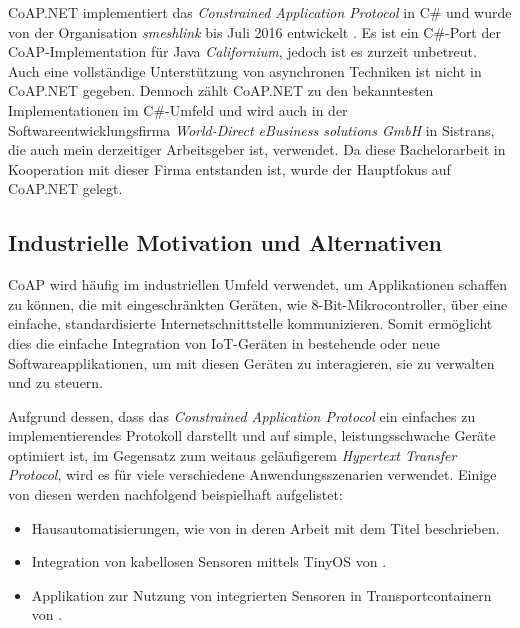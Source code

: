 CoAP.NET implementiert das \textit{Constrained Application Protocol} in C\# und wurde von der Organisation \textit{smeshlink} bis Juli 2016 entwickelt \autocite{coapnet}. Es ist ein C\#-Port der CoAP-Implementation für Java \textit{Californium}, jedoch ist es zurzeit unbetreut. Auch eine vollständige Unterstützung von asynchronen Techniken ist nicht in CoAP.NET gegeben. Dennoch zählt CoAP.NET zu den bekanntesten Implementationen im C\#-Umfeld und wird auch in der Softwareentwicklungsfirma \textit{World-Direct eBusiness solutions GmbH} in Sistrans, die auch mein derzeitiger Arbeitsgeber ist, verwendet. Da diese Bachelorarbeit in Kooperation mit dieser Firma entstanden ist, wurde der Hauptfokus auf CoAP.NET gelegt.

\subsection{Industrielle Motivation und Alternativen}
\label{subsec:industrielle-motivation-und-alternativen}

CoAP wird häufig im industriellen Umfeld verwendet, um Applikationen schaffen zu können, die mit eingeschränkten Geräten, wie 8-Bit-Mikrocontroller, über eine einfache, standardisierte Internetschnittstelle kommunizieren. Somit ermöglicht dies die einfache Integration von IoT-Geräten in bestehende oder neue Softwareapplikationen, um mit diesen Geräten zu interagieren, sie zu verwalten und zu steuern.

Aufgrund dessen, dass das \textit{Constrained Application Protocol} ein einfaches zu implementierendes Protokoll darstellt und auf simple, leistungsschwache Geräte optimiert ist, im Gegensatz zum weitaus geläufigerem \textit{Hypertext Transfer Protocol}, wird es für viele verschiedene Anwendungsszenarien verwendet. Einige von diesen werden nachfolgend beispielhaft aufgelistet:
\begin{itemize}
    \item Hausautomatisierungen, wie von \citeauthor{HomeAutomationUsingCoAP} in deren Arbeit mit dem Titel  \autocite{HomeAutomationUsingCoAP} beschrieben.
    \item Integration von kabellosen Sensoren mittels TinyOS von \citeauthor{TinyCoAP} \autocite{TinyCoAP}.
    \item Applikation zur Nutzung von integrierten Sensoren in Transportcontainern von \citeauthor{TransportLogisticUsingCoAP} \autocite{TransportLogisticUsingCoAP}.
\end{itemize}

